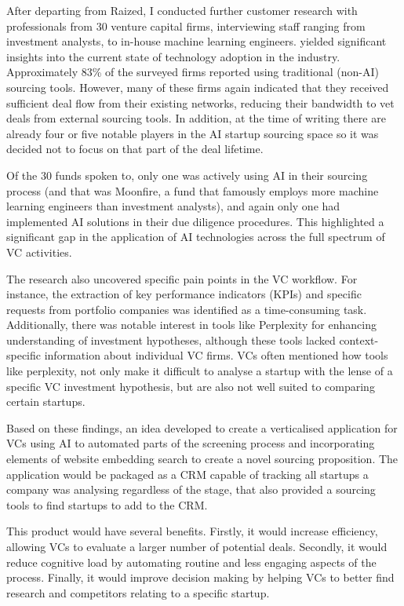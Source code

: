 \documentclass[a4paper, oneside]{discothesis}
\begin{document}
After departing from Raized, I conducted further customer research with professionals from 30 venture capital firms, interviewing staff ranging from investment analysts, to in-house machine learning engineers. yielded significant insights into the current state of technology adoption in the industry. Approximately 83\% of the surveyed firms reported using traditional (non-AI) sourcing tools. However, many of these firms again indicated that they received sufficient deal flow from their existing networks, reducing their bandwidth to vet deals from external sourcing tools. In addition, at the time of writing there are already four or five notable players in the AI startup sourcing space so it was decided not to focus on that part of the deal lifetime.

Of the 30 funds spoken to, only one was actively using AI in their sourcing process (and that was Moonfire, a fund that famously employs more machine learning engineers than investment analysts), and again only one had implemented AI solutions in their due diligence procedures. This highlighted a significant gap in the application of AI technologies across the full spectrum of VC activities.

The research also uncovered specific pain points in the VC workflow. For instance, the extraction of key performance indicators (KPIs) and specific requests from portfolio companies was identified as a time-consuming task. Additionally, there was notable interest in tools like Perplexity for enhancing understanding of investment hypotheses, although these tools lacked context-specific information about individual VC firms. VCs often mentioned how tools like perplexity, not only make it difficult to analyse a startup with the lense of a specific VC investment hypothesis, but are also not well suited to comparing certain startups. 

Based on these findings, an idea developed to create a verticalised application for VCs using AI to automated parts of the screening process and incorporating elements of website embedding search to create a novel sourcing proposition. The application would be packaged as a CRM capable of tracking all startups a company was analysing regardless of the stage, that also provided a sourcing tools to find startups to add to the CRM.

This product would have several benefits. Firstly, it would increase efficiency, allowing VCs to evaluate a larger number of potential deals. Secondly, it would reduce cognitive load by automating routine and less engaging aspects of the process. Finally, it would improve decision making by helping VCs to better find research and competitors relating to a specific startup.
\end{document}

